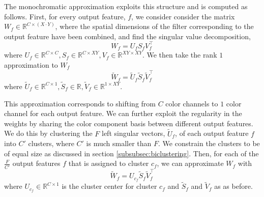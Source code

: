 The monochromatic approximation exploits this structure and is computed as follows.
First, for every output feature, $f$, we consider consider the matrix $W_f \in \mathbb{R}^{C \times (X\cdot Y) }$, 
where the spatial dimensions of the filter corresponding to the output feature have been combined, and find the singular value decomposition, 
\begin{equation*}
	W_f = U_f S_f V_f^{\top}
\end{equation*}
where $U_f \in \mathbb{R}^{C \times C}, S_f \in \mathbb{R}^{C \times XY}, V_f \in \mathbb{R}^{XY \times XY}$. 
We then take the rank $1$ approximation to $W_f$ 
\begin{equation}
\label{blo1}
	\tilde{W}_f = \tilde{U}_f \tilde{S}_f \tilde{V}_f^{\top}
\end{equation}
where $\tilde{U}_f \in \mathbb{R}^{C \times 1}, \tilde{S}_f \in \mathbb{R}, \tilde{V}_f \in \mathbb{R}^{1 \times XY}$.

This approximation corresponds to shifting from $C$ color channels to $1$ color channel for each output feature. 
We can further exploit the regularity in the weights by sharing the color component basis between different output features. 
We do this by clustering the $F$ left singular vectors, $\tilde{U}_f$, of each output feature $f$ into $C'$ clusters, 
where $C'$ is much smaller than $F$. We constrain the clusters to be of equal size as discussed in section \ref{subsubsec:biclustering}.  
Then, for each of the $\frac{F}{C'}$ output features $f$ that is assigned to cluster $c_f$, we can approximate $W_f$ with
\begin{equation}
\label{blo2}
	\tilde{W}_f = U_{c_f} \tilde{S}_f \tilde{V}_f^{\top}
\end{equation}
where $U_{c_f} \in \mathbb{R}^{C \times 1}$ is the cluster center for cluster $c_f$ and $\tilde{S}_f$ and $\tilde{V}_f$ as as before. 


